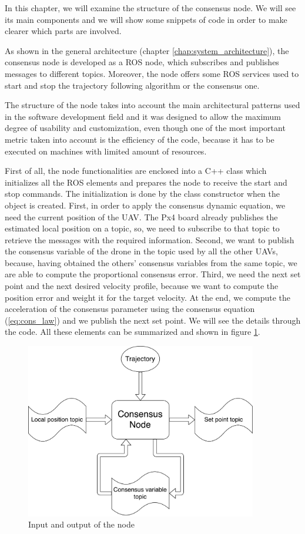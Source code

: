 In this chapter, we will examine the structure of the consensus node. We will see
its main components and we will show some snippets of code
in order to make clearer which parts are involved.

As shown in the general architecture (chapter \ref{chap:system_architecture}),
the consensus node is developed as a ROS node, which subscribes and publishes messages
to different topics.
Moreover, the node offers some ROS services used to start and stop the trajectory
following algorithm or the consensus one.

The structure of the node takes into account the main architectural patterns used
in the software development field and it was designed to allow the maximum degree
of usability and customization, even though one of the most important metric taken
into account is the efficiency of the code, because it has to be executed on
machines with limited amount of resources.

First of all, the node functionalities are enclosed into a C++ class which initializes
all the ROS elements and prepares the node to receive the start and stop commands.
The initialization is done by the class constructor when the object is created.
First, in order to apply the consensus dynamic equation, we need
the current position of the UAV. The Px4 board already publishes the estimated
local position on a topic,
so, we need to subscribe to that topic to retrieve the messages with the required
information.
Second, we want to publish the consensus variable of the drone in the topic used
by all the other UAVs, because, having obtained the others' consensus variables
from the same topic, we are able to compute the proportional consensus error.
Third, we need the next set point and the next desired velocity profile,
because we want to compute the position error and weight it for the target velocity.
At the end, we compute the acceleration of the consensus parameter using the consensus equation (\ref{eq:cons_law})
and we publish the next set point. We will see the details through the code.
All these elements can be summarized and shown in figure \ref{fig:node_in_out}.

\begin{figure}[ht]
\centering
\includegraphics[width=0.9\textwidth]{chapters/chapter-03/figures/consensus_node_structure.pdf}
\caption{Input and output of the node}
\label{fig:node_in_out}
\end{figure}

